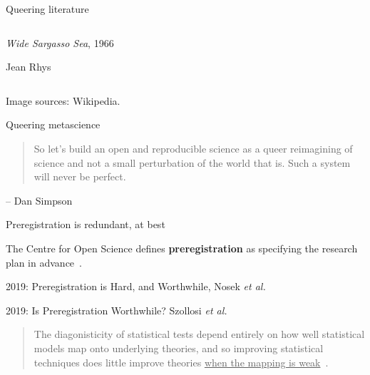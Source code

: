\documentclass{beamer}
\begin{document}
\begin{frame}{Queering literature}
\begin{centering}
\begin{columns}
\begin{column}{0.5\textwidth}
\small{
\emph{Wide Sargasso Sea}, 1966

\medskip

Jean Rhys~\cite{rhys1992wide}
}


\end{column}

\end{columns}

\begin{flushright}
\tiny{Image sources: Wikipedia.}
\end{flushright}





\end{centering}

\end{frame}

\begin{frame}{Queering metascience}

    \begin{quote}
        So let’s build an open and reproducible science as a queer reimagining of science and not a small perturbation of the world that is. Such a system will never be perfect.
    \end{quote}

\begin{flushright}
-- Dan Simpson~\cite{simpson_what_2019}
\end{flushright}

\end{frame}

\begin{frame}{Preregistration is redundant, at best}

The Centre for Open Science defines \textbf{preregistration} as specifying the research plan in advance~\cite{centre_for_open_science_preregistration_2020}.

\vspace{1cm}

2019: Preregistration is Hard, and Worthwhile, Nosek \emph{et al.}~\cite{nosek_preregistration_2019}

\vspace{1cm}

2019: Is Preregistration Worthwhile? Szollosi \emph{et al.}~\cite{szollosi_preregistration_2019}

\bigskip

\begin{quote}
The diagonisticity of statistical tests depend entirely on how well statistical models map onto underlying theories, and so improving statistical techniques does little improve theories \underline{when the mapping is weak}~\cite{szollosi_preregistration_2019}.
\end{quote}


\end{frame}
\end{document}
